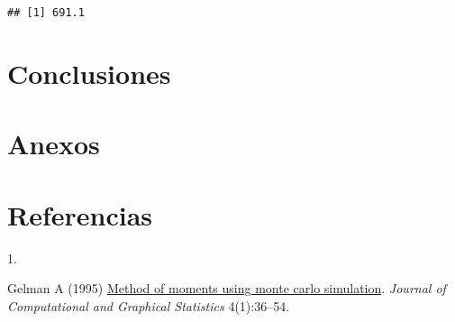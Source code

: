 \documentclass[9pt,twocolumn,twoside,]{pnas-new}
\newlength{\csllabelwidth}
\newlength{\cslhangindent}
\newenvironment{CSLReferences}[2] %
 {%
  \setlength{\parindent}{0pt}
  \ifodd #1 \everypar{\setlength{\hangindent}{\cslhangindent}}\ignorespaces\fi
  \ifnum #2 > 0
  \setlength{\parskip}{#2\baselineskip}
  \fi
 }%
 {}
\newcommand{\CSLLeftMargin}[1]{\parbox[t]{\csllabelwidth}{#1}}
\newcommand{\CSLRightInline}[1]{\parbox[t]{\linewidth - \csllabelwidth}{#1}\break}
\begin{document}
\begin{verbatim}
## [1] 691.1
\end{verbatim}

\lipsum[8-10]

\hypertarget{conclusiones}{%
\section*{Conclusiones}\label{conclusiones}}

\lipsum[10-12]

\hypertarget{anexos}{%
\section*{Anexos}\label{anexos}}

\hypertarget{referencias}{%
\section*{Referencias}\label{referencias}}

\showmatmethods
\showacknow
\pnasbreak

\hypertarget{refs}{}
\begin{CSLReferences}{0}{0}
\leavevmode{}%
\CSLLeftMargin{1. }
\CSLRightInline{Gelman A (1995)
\href{http://www.jstor.org/stable/1390626}{Method of moments using monte
carlo simulation}. \emph{Journal of Computational and Graphical
Statistics} 4(1):36--54.}

\end{CSLReferences}



% 
\end{document}
